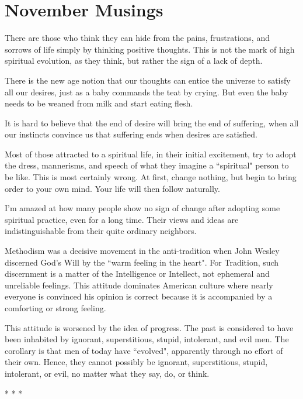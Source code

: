 \section{November Musings}

There are those who think they can hide from the pains, frustrations, and sorrows of life simply by thinking positive thoughts. This is not the mark of high spiritual evolution, as they think, but rather the sign of a lack of depth.

There is the new age notion that our thoughts can entice the universe to satisfy all our desires, just as a baby commands the teat by crying. But even the baby needs to be weaned from milk and start eating flesh.

It is hard to believe that the end of desire will bring the end of suffering, when all our instincts convince us that suffering ends when desires are satisfied.

Most of those attracted to a spiritual life, in their initial excitement, try to adopt the dress, mannerisms, and speech of what they imagine a ``spiritual" person to be like. This is most certainly wrong. At first, change nothing, but begin to bring order to your own mind. Your life will then follow naturally.

I'm amazed at how many people show no sign of change after adopting some spiritual practice, even for a long time. Their views and ideas are indistinguishable from their quite ordinary neighbors.

Methodism was a decisive movement in the anti-tradition when John Wesley discerned God's Will by the ``warm feeling in the heart". For Tradition, such discernment is a matter of the Intelligence or Intellect, not ephemeral and unreliable feelings. This attitude dominates American culture where nearly everyone is convinced his opinion is correct because it is accompanied by a comforting or strong feeling.

This attitude is worsened by the idea of progress. The past is considered to have been inhabited by ignorant, superstitious, stupid, intolerant, and evil men. The corollary is that men of today have ``evolved", apparently through no effort of their own. Hence, they cannot possibly be ignorant, superstitious, stupid, intolerant, or evil, no matter what they say, do, or think.




\begin{center}* * *\end{center}

